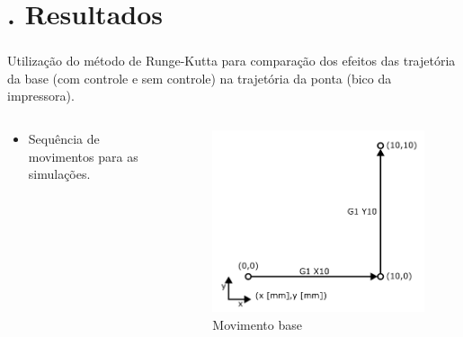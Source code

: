 \documentclass[aspectratio=169]{beamer}
\begin{document}
\section{\insertsectionnumber . Resultados}

\begin{frame}
  \frametitle{\insertsection}
  Utilização do método de Runge-Kutta para comparação dos efeitos das trajetória da base (com controle e sem controle) na trajetória da ponta (bico da impressora).
  \begin{columns}
    \begin{column}{.4\textwidth}
      \begin{itemize}
        \item Sequência de movimentos para as simulações.
      \end{itemize}
    \end{column}
    \begin{column}{.5\textwidth}
      \begin{figure}[H]
        \centering
        \caption{Movimento base}
        \includegraphics[width=.85\textwidth]{base_mov}
    
        \label{fig:base_mov}
      \end{figure}
    \end{column}
  \end{columns}
\end{frame}
\end{document}
